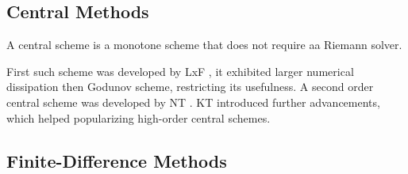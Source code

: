 

\subsection{Central Methods}

A central scheme is a monotone scheme that does not require aa Riemann solver. 

First such scheme was developed by \ac{LxF} \citep{Lax:1954,Friedrichs:1954}, 
it exhibited larger numerical dissipation then Godunov scheme, restricting its usefulness.
A second order central scheme was developed by \ac{NT} \citep{Nessyahu:1990}.
\ac{KT} \citep{Kurganov:2000} introduced further advancements, which helped popularizing high-order central schemes. 

%


\subsection{Finite-Difference Methods}

%


